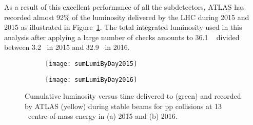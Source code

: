 As a result of this excellent performance of all the subdetectors,
ATLAS has recorded  almost 92\% of the luminosity delivered by the LHC during 
2015 and 2015 as illustrated in  Figure~\ref{fig:exp.op.intlumi}.
The total integrated luminosity used in this analysis after 
applying a large number of checks amounts to 
 36.1 \ifb~ divided between 3.2 \ifb~in 2015 and 32.9 \ifb~in 2016.

\begin{figure}[t!]
\centering
\begin{subfigure}[t]{0.48\textwidth}
\texttt{[image: sumLumiByDay2015]}
\end{subfigure}
\begin{subfigure}[t]{0.48\textwidth}
\texttt{[image: sumLumiByDay2016]}
\end{subfigure}
\vspace{-0.3cm}
\caption{
Cumulative luminosity versus time delivered to (green) and recorded by ATLAS 
(yellow) during stable beams for pp collisions at 13 \TeV~centre-of-mass energy 
in (a) 2015 and (b) 2016.
}
\label{fig:exp.op.intlumi}
\end{figure} 


